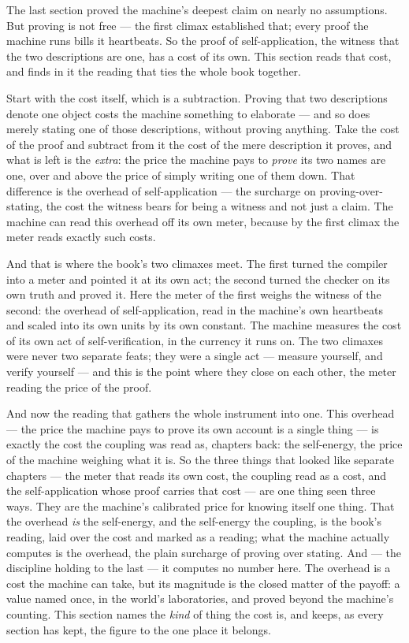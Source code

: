 The last section proved the machine's deepest claim on nearly no assumptions. But proving is not free --- the first
climax established that; every proof the machine runs bills it heartbeats. So the proof of self-application, the witness
that the two descriptions are one, has a cost of its own. This section reads that cost, and finds in it the reading
that ties the whole book together.

Start with the cost itself, which is a subtraction. Proving that two descriptions denote one object costs the machine
something to elaborate --- and so does merely stating one of those descriptions, without proving anything. Take the
cost of the proof and subtract from it the cost of the mere description it proves, and what is left is the \emph{extra}:
the price the machine pays to \emph{prove} its two names are one, over and above the price of simply writing one of
them down. That difference is the overhead of self-application --- the surcharge on proving-over-stating, the cost the
witness bears for being a witness and not just a claim. The machine can read this overhead off its own meter, because
by the first climax the meter reads exactly such costs.

And that is where the book's two climaxes meet. The first turned the compiler into a meter and pointed it at its own
act; the second turned the checker on its own truth and proved it. Here the meter of the first weighs the witness of
the second: the overhead of self-application, read in the machine's own heartbeats and scaled into its own units by its
own constant. The machine measures the cost of its own act of self-verification, in the currency it runs on. The two
climaxes were never two separate feats; they were a single act --- measure yourself, and verify yourself --- and this
is the point where they close on each other, the meter reading the price of the proof.

And now the reading that gathers the whole instrument into one. This overhead --- the price the machine pays to prove
its own account is a single thing --- is exactly the cost the coupling was read as, chapters back: the self-energy, the
price of the machine weighing what it is. So the three things that looked like separate chapters --- the meter that
reads its own cost, the coupling read as a cost, and the self-application whose proof carries that cost --- are one
thing seen three ways. They are the machine's calibrated price for knowing itself one thing. That the overhead
\emph{is} the self-energy, and the self-energy the coupling, is the book's reading, laid over the cost and marked as a
reading; what the machine actually computes is the overhead, the plain surcharge of proving over stating. And --- the
discipline holding to the last --- it computes no number here. The overhead is a cost the machine can take, but its
magnitude is the closed matter of the payoff: a value named once, in the world's laboratories, and proved beyond the
machine's counting. This section names the \emph{kind} of thing the cost is, and keeps, as every section has kept, the
figure to the one place it belongs.

